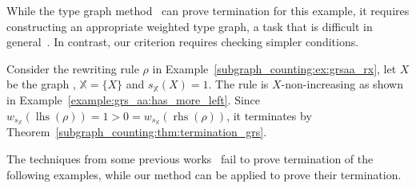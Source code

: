 While the type graph method~\cite{bruggink2014termination, bruggink2015proving,endrullis2024generalized_arxiv_v2} can prove termination for this example, it requires constructing an appropriate weighted type graph, a task that is difficult in general~\cite[]{bruggink2015proving}. 
In contrast, our criterion requires checking simpler conditions.
\begin{example}
    \label{subgraph_counting:ex:termination:grsaa}
    Consider the rewriting rule $\rho$ in Example~\ref{subgraph_counting:ex:grsaa_rx}, let $X$ be the graph , $\mathbb{X}\mathop{=}\{X\}$ and $s_\mathbb{X}(X)\mathop{=}1$. The rule is $X$-non-increasing as shown in Example~\ref{example:grs_aa:has_more_left}. 
    Since \(w_{s_\mathbb{X}}(\operatorname{lhs}(\rho))\mathop{=}1\mathop{>}0\mathop{=}w_{s_\mathbb{X}}(\operatorname{rhs}(\rho)) \),
    it terminates by Theorem~\ref{subgraph_counting:thm:termination_grs}.
\end{example}
The techniques from some previous works~\cite{bruggink2014termination,bruggink2015proving,endrullis2024generalized_arxiv_v2,plump2018modular,overbeek2024termination_lmcs} fail to prove termination of the following examples, while our method can be applied to prove their termination.
